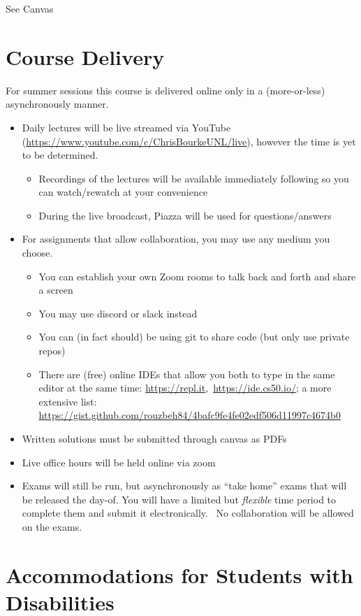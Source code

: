\documentclass[12pt]{scrartcl}
\begin{document}
See Canvas

\section{Course Delivery}

For summer sessions this course is delivered online only in a (more-or-less) 
asynchronously manner.  
\begin{itemize}
  \item Daily lectures will be live streamed via 
  YouTube (\url{https://www.youtube.com/c/ChrisBourkeUNL/live}), however 
  the time is yet to be determined. 
  \begin{itemize}
    \item Recordings of the lectures will be available 
    immediately following so you can watch/rewatch at your convenience
    \item During the live broadcast, Piazza will be used for 
    questions/answers
  \end{itemize}
  \item For assignments that allow collaboration, you may use any medium
  you choose.  
  \begin{itemize}
    \item You can establish your own Zoom rooms to talk back and forth 
    and share a screen
    \item You may use discord or slack instead
    \item You can (in fact should) be using git to share code (but 
    only use private repos)
    \item There are (free) online IDEs that allow you both to type in the same 
    editor at the same time: \url{https://repl.it}, \url{https://ide.cs50.io/};
    a more extensive list: \url{https://gist.github.com/rouzbeh84/4bafc9fe4fe02edf506d11997c4674b0}
  \end{itemize}
  \item Written solutions must be submitted through canvas as PDFs
  \item Live office hours will be held online via zoom 
  \item Exams will still be run, but asynchronously as ``take home'' exams 
  that will be released the day-of.  You will have a limited but 
  \emph{flexible} time period to complete them and submit it electronically.  
  No collaboration will be allowed on the exams.
\end{itemize}

\section{Accommodations for Students with Disabilities}
\end{document}
